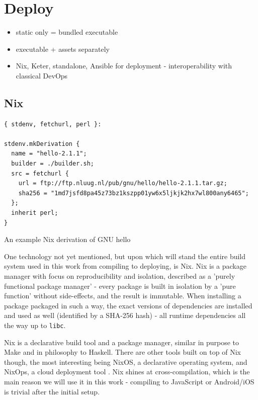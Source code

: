 \documentclass[english,odsaz]{fitthesis}
\begin{document}
\section{Deploy}
\label{sec:orge451aa2}
\begin{itemize}
\item static only = bundled executable
\item executable + assets separately
\item Nix, Keter, standalone, Ansible for deployment - interoperability with classical DevOps
\end{itemize}

\subsection{Nix}
\label{sec:orga63bd9b}
\begin{listing}[htbp]
\begin{verbatim}
{ stdenv, fetchurl, perl }:

stdenv.mkDerivation {
  name = "hello-2.1.1";
  builder = ./builder.sh;
  src = fetchurl {
    url = ftp://ftp.nluug.nl/pub/gnu/hello/hello-2.1.1.tar.gz;
    sha256 = "1md7jsfd8pa45z73bz1kszpp01yw6x5ljkjk2hx7wl800any6465";
  };
  inherit perl;
}
\end{verbatim}
\caption{An example Nix derivation of GNU hello}
\end{listing}

One technology not yet mentioned, but upon which will stand the entire build
system used in this work from compiling to deploying, is Nix. Nix
\cite{dolstra2006purely} is a package manager with focus on reproducibility and
isolation, described as a 'purely functional package manager' - every package is
built in isolation by a 'pure function' without side-effects, and the result is
immutable. When installing a package packaged in such a way, the exact versions
of dependencies are installed and used as well (identified by a SHA-256 hash) -
all runtime dependencies all the way up to \texttt{libc}.

Nix is a declarative build tool and a package manager, similar in purpose to
Make and in philosophy to Haskell. There are other tools built on top of Nix
though, the most interesting being NixOS, a declarative operating system, and
NixOps, a cloud deployment tool \cite{dolstra2008nixos}. Nix shines at
cross-compilation, which is the main reason we will use it in this work -
compiling to JavaScript or Android/iOS is trivial after the initial setup.
\end{document}
